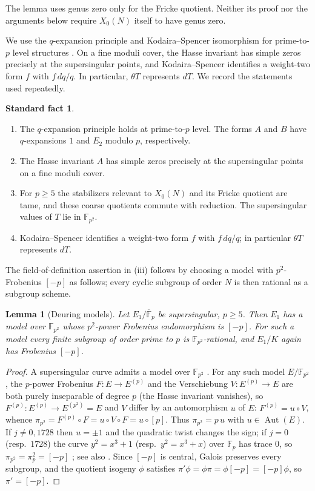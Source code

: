 \documentclass[11pt,a4paper]{article}
\numberwithin{equation}{section}
\newtheorem{lemma}[theorem]{Lemma}
\theoremstyle{definition}
\newtheorem{fact}{Standard fact}
\theoremstyle{remark}
\newcommand{\Fp}{\mathbb F_p}
\newcommand{\Fq}{\mathbb F_{p^2}}
\newcommand{\Fb}{\overline{\mathbb F}_p}
\newcommand{\Aut}{\operatorname{Aut}}
\begin{document}
The lemma uses genus zero only for the Fricke quotient. Neither its
proof nor the arguments below require $X_0(N)$ itself to have genus zero.


We use the $q$-expansion principle and Kodaira--Spencer isomorphism for prime-to-$p$
level structures \citep{Katz73,KM85,Gross90}. On a fine moduli cover, the Hasse invariant
has simple zeros precisely at the supersingular points, and Kodaira--Spencer identifies
a weight-two form $f$ with $f\,dq/q$. In particular, $\theta T$ represents $dT$.
We record the statements used repeatedly.
\begin{fact}\label{fact:modp}\leavevmode
\begin{enumerate}[label=\textup{(\roman*)}]
\item The $q$-expansion principle holds at prime-to-$p$ level. The forms
$A$ and $B$ have $q$-expansions $1$ and $E_2$ modulo $p$, respectively.
\item The Hasse invariant $A$ has simple zeros precisely at the
supersingular points on a fine moduli cover.
\item For $p\ge5$ the stabilizers relevant to $X_0(N)$ and its Fricke
quotient are tame, and these coarse quotients commute with reduction.
The supersingular values of $T$ lie in $\Fq$.
\item Kodaira--Spencer identifies a weight-two form $f$ with
$f\,dq/q$; in particular $\theta T$ represents $dT$.
\end{enumerate}
\end{fact}
The field-of-definition assertion in (iii) follows by choosing a model
with $p^2$-Frobenius $[-p]$ as follows; every cyclic subgroup of order
$N$ is then rational as a subgroup scheme.

\begin{lemma}[Deuring models]\label{lem:deuring}
Let $E_1/\Fb$ be supersingular, $p\ge5$. Then $E_1$ has a model over $\Fq$ whose $p^2$-power
Frobenius endomorphism is $[-p]$. For such a model every finite subgroup of order prime to $p$ is
$\Fq$-rational, and $E_1/K$ again has Frobenius $[-p]$.
\end{lemma}
\begin{proof}
A supersingular curve admits a model over $\Fq$
\citep{Deuring41,Waterhouse69}. For any such model $E/\Fq$, the $p$-power Frobenius $F:E\to E^{(p)}$ and the
Verschiebung $V:E^{(p)}\to E$ are both purely inseparable of degree $p$ (the Hasse invariant
vanishes), so $F^{(p)}:E^{(p)}\to E^{(p^2)}=E$ and $V$ differ by an automorphism $u$ of $E$:
$F^{(p)}=u\circ V$, whence $\pi_{p^2}=F^{(p)}\circ F=u\circ V\circ F=u\circ[p]$. Thus
$\pi_{p^2}=p\,u$ with $u\in\Aut(E)$. If $j\ne0,1728$ then $u=\pm1$ and the quadratic twist changes
the sign; if $j=0$ (resp.\ $1728$) the curve $y^2=x^3+1$ (resp.\ $y^2=x^3+x$) over $\Fp$ has
trace $0$, so $\pi_{p^2}=\pi_p^2=[-p]$ \citep{Deuring41,Waterhouse69}; see also
\citet[Lemma~4.3]{Ono25}. Since $[-p]$ is central, Galois preserves every subgroup, and the quotient
isogeny $\phi$ satisfies $\pi'\phi=\phi\pi=\phi[-p]=[-p]\phi$, so $\pi'=[-p]$.
\end{proof}
\end{document}

